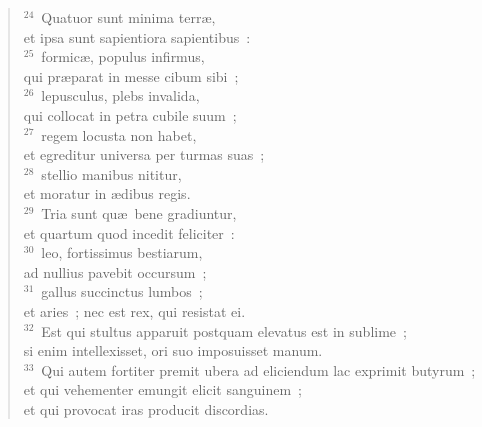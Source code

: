 \begin{flushleft}\begin{verse}${}^{24}$~Quatuor sunt minima terr\ae ,\\ et ipsa sunt sapientiora sapientibus~:\\
${}^{25}$~formic\ae , populus infirmus,\\ qui pr\ae parat in messe cibum sibi~;\\
${}^{26}$~lepusculus, plebs invalida,\\ qui collocat in petra cubile suum~;\\
${}^{27}$~regem locusta non habet,\\ et egreditur universa per turmas suas~;\\
${}^{28}$~stellio manibus nititur,\\ et moratur in \ae dibus regis.\\
${}^{29}$~Tria sunt qu\ae\ bene gradiuntur,\\ et quartum quod incedit feliciter~:\\
${}^{30}$~leo, fortissimus bestiarum,\\ ad nullius pavebit occursum~;\\
${}^{31}$~gallus succinctus lumbos~;\\ et aries~; nec est rex, qui resistat ei.\\
${}^{32}$~Est qui stultus apparuit postquam elevatus est in sublime~;\\ si enim intellexisset, ori suo imposuisset manum.\\
${}^{33}$~Qui autem fortiter premit ubera ad eliciendum lac exprimit butyrum~;\\ et qui vehementer emungit elicit sanguinem~;\\ et qui provocat iras producit discordias.\end{verse}\end{flushleft}



